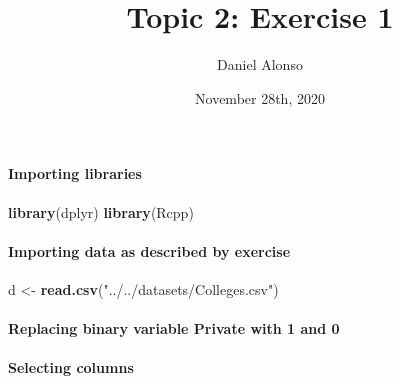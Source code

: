 \documentclass[]{article}
\title{Topic 2: Exercise 1}
\author{Daniel Alonso}
\date{November 28th, 2020}
\newenvironment{Shaded}{\begin{snugshade}}{\end{snugshade}}
\newcommand{\DecValTok}[1]{\textcolor[rgb]{0.00,0.00,0.81}{#1}}
\newcommand{\KeywordTok}[1]{\textcolor[rgb]{0.13,0.29,0.53}{\textbf{#1}}}
\newcommand{\NormalTok}[1]{#1}
\newcommand{\OperatorTok}[1]{\textcolor[rgb]{0.81,0.36,0.00}{\textbf{#1}}}
\newcommand{\StringTok}[1]{\textcolor[rgb]{0.31,0.60,0.02}{#1}}
\let\oldparagraph\paragraph
\renewcommand{\paragraph}[1]{\oldparagraph{#1}\mbox{}}
\begin{document}
\maketitle

\hypertarget{importing-libraries}{%
\paragraph{Importing libraries}\label{importing-libraries}}

\begin{Shaded}
\begin{Highlighting}[]
\KeywordTok{library}\NormalTok{(dplyr)}
\KeywordTok{library}\NormalTok{(Rcpp)}
\end{Highlighting}
\end{Shaded}

\hypertarget{importing-data-as-described-by-exercise}{%
\paragraph{Importing data as described by
exercise}\label{importing-data-as-described-by-exercise}}

\begin{Shaded}
\begin{Highlighting}[]
\NormalTok{d <-}\StringTok{ }\KeywordTok{read.csv}\NormalTok{(}\StringTok{"../../datasets/Colleges.csv"}\NormalTok{)}
\end{Highlighting}
\end{Shaded}

\hypertarget{replacing-binary-variable-private-with-1-and-0}{%
\paragraph{Replacing binary variable Private with 1 and
0}\label{replacing-binary-variable-private-with-1-and-0}}

\begin{Shaded}
\end{Shaded}

\hypertarget{selecting-columns}{%
\paragraph{Selecting columns}\label{selecting-columns}}
\end{document}
